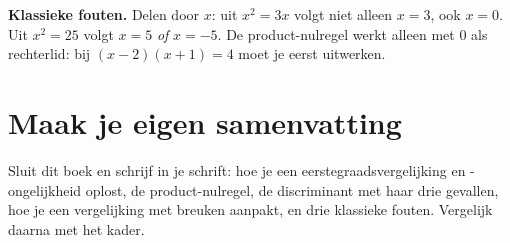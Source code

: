 \textbf{Klassieke fouten.} Delen door $x$: uit $x^2 = 3x$ volgt niet alleen $x = 3$, ook $x = 0$. Uit $x^2 = 25$ volgt $x = 5$ \emph{of} $x = -5$. De product-nulregel werkt alleen met $0$ als rechterlid: bij $(x - 2)(x + 1) = 4$ moet je eerst uitwerken.


\opdrachtenkop

\begin{oefeningen}











\end{oefeningen}


\begin{oefeningen}




\end{oefeningen}


\ifzelfstudie
\section*{Maak je eigen samenvatting}
Sluit dit boek en schrijf in je schrift: hoe je een eerstegraadsvergelijking en -ongelijkheid oplost, de product-nulregel, de discriminant met haar drie gevallen, hoe je een vergelijking met breuken aanpakt, en drie klassieke fouten. Vergelijk daarna met het kader.
\fi
